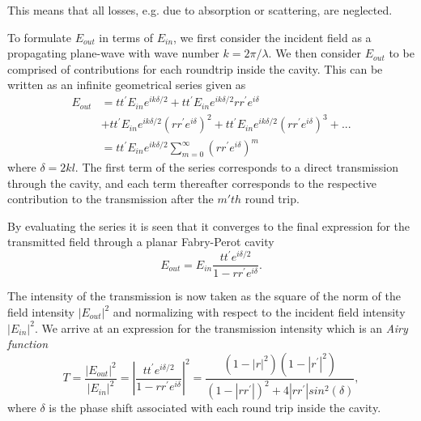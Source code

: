 This means that all losses, e.g. due to absorption or scattering, are neglected. 

To formulate $E_{out}$ in terms of $E_{in}$, we first consider the incident field as a propagating plane-wave with wave number $k = 2 \pi / \lambda$. We then consider $E_{out}$ to be comprised of contributions for each roundtrip inside the cavity. This can be written as an infinite geometrical series given as
\begin{equation}
    \begin{split}
        E_{out} & = tt^{\prime} E_{in} e^{ik \delta / 2} + tt^{\prime} E_{in} e^{ik \delta / 2} rr^{\prime} e^{i\delta}\\&+ tt^{\prime} E_{in} e^{ik \delta / 2} \left(rr^{\prime} e^{i\delta}\right)^2 + tt^{\prime} E_{in} e^{ik \delta / 2} \left(rr^{\prime} e^{i\delta}\right)^3 + ...\\& = tt^{\prime} E_{in} e^{ik \delta / 2} \sum^{\infty}_{m=0}\left( rr^{\prime}e^{i\delta} \right)^m
    \end{split}
    \label{eq:transmission_as_geometric_series}
\end{equation}
where $\delta = 2kl$. The first term of the series corresponds to a direct transmission through the cavity, and each term thereafter corresponds to the respective contribution to the transmission after the $m'th$ round trip. 

By evaluating the series it is seen that it converges to the final expression for the transmitted field through a planar Fabry-Perot cavity
\begin{equation}
    E_{out} = E_{in}\frac{tt^{\prime} e^{i\delta /2}}{1 - rr^{\prime} e^{i\delta}}.
    \label{eq:fabry_perot_trans}
\end{equation}

The intensity of the transmission is now taken as the square of the norm of the field intensity $|E_{out}|^2$ and normalizing with respect to the incident field intensity $|E_{in}|^2$. We arrive at an expression for the transmission intensity which is an \emph{Airy function}\cite{Pedrotti}
\begin{equation}
    T = \frac{|E_{out}|^2}{|E_{in}|^2} = \left|\frac{tt^{\prime}e^{i\delta/2}}{1 - rr^{\prime}e^{i \delta}}\right|^2 = \frac{(1-|r|^2)(1-|r^{\prime}|^2)}{(1-|rr^{\prime}|)^2 + 4|rr^{\prime}|sin^2(\delta)},
    \label{eq:airy_function}
\end{equation}
where $\delta$ is the phase shift associated with each round trip inside the cavity.

